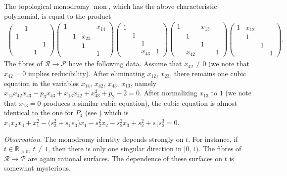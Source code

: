 \documentclass[10pt,a4paper]{amsart}
\numberwithin{equation}{section}
\begin{document}
 The topological monodromy $\operatorname{mon}$, which has the above characteristic polynomial, is equal to the
product
\begin{gather*}
\begin{pmatrix} &1 & & \\ 1& & & \\ & & &1 \\ & & 1& \end{pmatrix}
\begin{pmatrix} 1& & &x_{14} \\ & 1&x_{23} & \\ & &1 & \\ & & &1 \end{pmatrix}
\begin{pmatrix} 1& & & \\ & 1& & \\ & & 1& \\ & &x_{43} &1 \end{pmatrix}
 \begin{pmatrix} 1& & x_{13}& \\ & 1& & \\ & & 1& \\ & x_{42}& & 1 \end{pmatrix}
\begin{pmatrix} 1&x_{12} & & \\ & 1& & \\ & & 1& \\ & & & 1 \end{pmatrix}.
\end{gather*}
 The fibres of $\mathcal{R}\rightarrow \mathcal{P}$ have the following data.
Assume that $x_{42}\neq 0$ (we note that $x_{42}=0$ implies reducibility). After eliminating $x_{12}$, $x_{23}$, there remains one
cubic equation in the variables $x_{14}$, $x_{42}$, $x_{43}$, $x_{13}$, namely
$x_{14}x_{42}x_{43} - p_3x_{43} + x_{13}x_{42} + x_{43}^2 + p_2 + 2=0$.
After normalizing $x_{13}$ to $1$ (we note that $x_{13}=0$ produces a similar cubic equation), the cubic equation is almost identical
to the one for $P_4$ (see \cite{vdP-Sa}) which is
$x_1x_2x_3+x_1^2-\big(s_2^2 +s_1s_3\big)x_1-s_2^2x_2-s_2^2x_3+s_2^2+s_1s_2^3=0$.

{\it Observation}. The monodromy identity depends strongly on $t$. For instance, if $t\in \mathbb{R}_{>0}$, $t\neq 1$, then there is only one singular direction in $[0,1)$. The fibres of $\mathcal{R}\rightarrow \mathcal{P}$ are again rational surfaces.
 The dependence of these surfaces on $t$ is somewhat mysterious.
\end{document}

